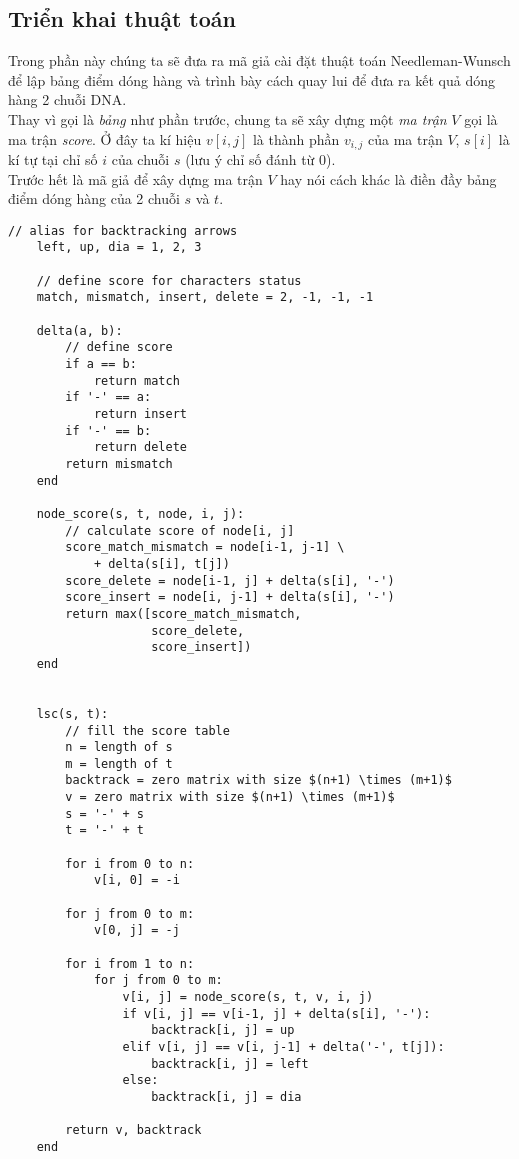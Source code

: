 \subsection{Triển khai thuật toán}
Trong phần này chúng ta sẽ đưa ra mã giả cài đặt thuật toán Needleman-Wunsch để lập bảng điểm
dóng hàng và trình bày cách quay lui để đưa ra kết quả dóng hàng 2 chuỗi DNA. \\
Thay vì gọi là \textit{bảng} như phần trước, chung ta sẽ xây dựng một 
\textit{ma trận} $V$ gọi là ma trận \textit{score}.
Ở đây ta kí hiệu $v[i, j]$ là thành phần $v_{i,j}$ của ma trận $V$,
$s[i]$ là kí tự tại chỉ số $i$ của chuỗi $s$ (lưu ý chỉ số đánh từ $0$). \\
Trước hết là mã giả để  xây dựng ma trận $V$ hay nói cách khác là điền đầy 
bảng điểm dóng hàng của 2 chuỗi $s$ và $t$.

\begin{lstlisting}[style=algo]
    // alias for backtracking arrows
    left, up, dia = 1, 2, 3 

    // define score for characters status
    match, mismatch, insert, delete = 2, -1, -1, -1

    delta(a, b):
        // define score
        if a == b:
            return match
        if '-' == a:
            return insert
        if '-' == b:
            return delete
        return mismatch
    end

    node_score(s, t, node, i, j):
        // calculate score of node[i, j]
        score_match_mismatch = node[i-1, j-1] \
            + delta(s[i], t[j])
        score_delete = node[i-1, j] + delta(s[i], '-')
        score_insert = node[i, j-1] + delta(s[i], '-')
        return max([score_match_mismatch, 
                    score_delete, 
                    score_insert])
    end


    lsc(s, t):
        // fill the score table
        n = length of s
        m = length of t
        backtrack = zero matrix with size $(n+1) \times (m+1)$
        v = zero matrix with size $(n+1) \times (m+1)$
        s = '-' + s
        t = '-' + t

        for i from 0 to n:
            v[i, 0] = -i

        for j from 0 to m:
            v[0, j] = -j

        for i from 1 to n:
            for j from 0 to m:
                v[i, j] = node_score(s, t, v, i, j)
                if v[i, j] == v[i-1, j] + delta(s[i], '-'):
                    backtrack[i, j] = up
                elif v[i, j] == v[i, j-1] + delta('-', t[j]):
                    backtrack[i, j] = left
                else:
                    backtrack[i, j] = dia

        return v, backtrack
    end
\end{lstlisting}


